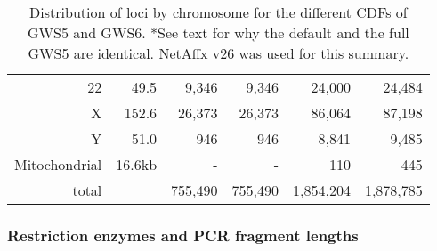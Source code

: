 \documentclass[10pt,a4paper]{article}
\begin{document}
\begin{table}[htp]
\begin{center}
\begin{tabular}{|r|r||rr||rr|}
22 &  49.5   &  9,346  &   9,346  &   24,000  &   24,484  \\
X  & 152.6   & 26,373  &  26,373  &   86,064  &   87,198  \\
Y  &  51.0   &    946  &     946  &    8,841  &    9,485  \\
\hline
Mitochondrial  &  16.6kb &      -  &       -  &      110  &      445  \\
\hline
total  &     & 755,490 &  755,490 & 1,854,204 & 1,878,785 \\
\hline
\end{tabular}
\end{center}
\caption{Distribution of loci by chromosome for the different CDFs of GWS5 and GWS6.  *See text for why the default and the full GWS5 are identical.  NetAffx v26 was used for this summary.}
\label{tblGenomicLocationByChromosome}
\end{table}


\subsubsection{Restriction enzymes and PCR fragment lengths}
\end{document}
